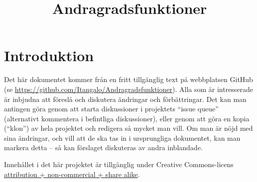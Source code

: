 \documentclass[12pt]{article}
\title{Andragradsfunktioner}
\date{}
\begin{document}
  \maketitle
  
  
  
  \section{Introduktion}
  Det här dokumentet kommer från en fritt tillgänglig text på webbplatsen GitHub (se \url{https://github.com/Itangalo/Andragradsfunktioner}).
  Alla som är intresserade är inbjudna att föreslå och diskutera ändringar och förbättringar.
  Det kan man antingen göra genom att starta diskussioner i projektets ``issue queue'' (alternativt kommentera i befintliga diskussioner), eller genom att göra en kopia (``klon'') av hela projektet och redigera så mycket man vill.
  Om man är nöjd med sina ändringar, och vill att de ska tas in i ursprungliga dokumentet, kan man markera detta -- så kan förslaget diskuteras av andra inblandade.

  Innehållet i det här projektet är tillgänglig under Creative Commons-licens \href{http://creativecommons.org/licenses/by-nc-sa/3.0/}{attribution + non-commercial + share alike}.
\end{document}
